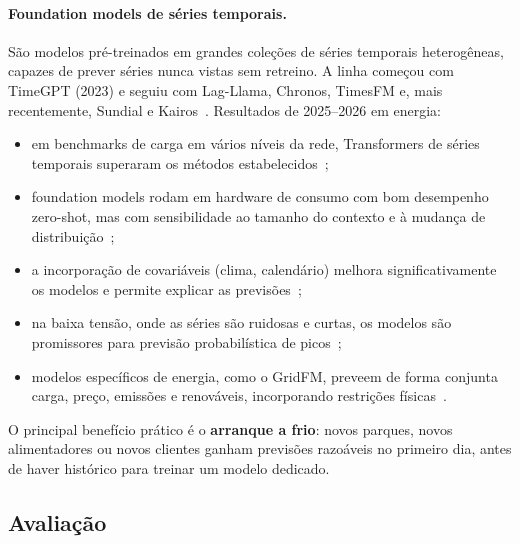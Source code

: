 \documentclass[11pt,a4paper]{article}
\begin{document}
\paragraph{Foundation models de séries temporais.} São modelos pré-treinados
em grandes coleções de séries temporais heterogêneas, capazes de prever
séries nunca vistas sem retreino. A linha começou com TimeGPT (2023) e seguiu
com Lag-Llama, Chronos, TimesFM e, mais recentemente, Sundial e
Kairos~\cite{fmreview}. Resultados de 2025--2026 em energia:
\begin{itemize}
  \item em benchmarks de carga em vários níveis da rede, Transformers de
    séries temporais superaram os métodos estabelecidos~\cite{loadbenchmark};
  \item foundation models rodam em hardware de consumo com bom desempenho
    zero-shot, mas com sensibilidade ao tamanho do contexto e à mudança de
    distribuição~\cite{tsfmconsumer};
  \item a incorporação de covariáveis (clima, calendário) melhora
    significativamente os modelos e permite explicar as previsões~\cite{tsfmxai};
  \item na baixa tensão, onde as séries são ruidosas e curtas, os modelos são
    promissores para previsão probabilística de picos~\cite{lvpeak};
  \item modelos específicos de energia, como o GridFM, preveem de forma
    conjunta carga, preço, emissões e renováveis, incorporando restrições
    físicas~\cite{gridfm}.
\end{itemize}
O principal benefício prático é o \textbf{arranque a frio}: novos parques,
novos alimentadores ou novos clientes ganham previsões razoáveis no primeiro
dia, antes de haver histórico para treinar um modelo dedicado.

\subsection{Avaliação}
\end{document}
